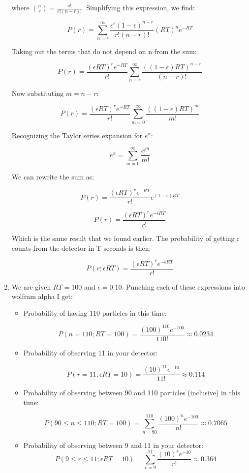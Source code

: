 \documentclass[10pt]{article}
\begin{document}
\begin{enumerate}[label=(\alph*)]
	      where $\binom{n}{r} = \frac{n!}{r!(n-r)!}$. Simplifying this expression, we find:

	      \[ P(r) = \sum_{n=r}^{\infty} \frac{\epsilon^r (1 - \epsilon)^{n - r}}{r!(n-r)!} (RT)^n e^{-RT} \]

	      Taking out the terms that do not depend on n from the sum:

	      \[ P(r) = \frac{(\epsilon RT)^r e^{-RT}}{r!} \sum_{n=r}^{\infty} \frac{((1 - \epsilon) RT)^{n - r}}{(n - r)!} \]

	      Now substituting $m=n-r$:

	      \[ P(r) = \frac{(\epsilon RT)^r e^{-RT}}{r!} \sum_{m=0}^{\infty} \frac{((1 - \epsilon) RT)^{m}}{m!} \]

	      Recognizing the Taylor series expansion for $e^x$:

	      \[ e^x = \sum_{m=0}^{\infty} \frac{x^m}{m!} \]

	      We can rewrite the sum as:

	      \[ P(r) = \frac{(\epsilon RT)^r e^{-RT}}{r!} e^{(1 - \epsilon) RT} \]

	      \[ P(r) = \frac{(\epsilon RT)^r e^{-\epsilon RT}}{r!} \]

	      Which is the same result that we found earlier. The probability of getting r counts from the detector in T seconds is then:

	      \[ \boxed{P(r; \epsilon RT) = \frac{(\epsilon RT)^r e^{-\epsilon RT}}{r!}} \]

	\item We are given $RT = 100$ and $\epsilon = 0.10$. Punching each of these expressions into wolfram alpha I get:

	      \begin{itemize}
		      \item Probability of having 110 particles in this time:

		            \[ \boxed{P(n=110; RT=100) = \frac{(100)^{110} e^{-100}}{110!} \approx 0.0234} \]

		      \item Probability of observing 11 in your detector:

		            \[ \boxed{P(r=11; \epsilon RT=10) = \frac{(10)^{11} e^{-10}}{11!} \approx 0.114} \]

		      \item Probability of observing between 90 and 110 particles (inclusive) in this time:

		            \[ \boxed{P(90 \leq n \leq 110; RT=100) = \sum_{n=90}^{110} \frac{(100)^n e^{-100}}{n!} \approx 0.7065} \]

		      \item Probability of observing between 9 and 11 in your detector:
		            \[ \boxed{P(9 \leq r \leq 11; \epsilon RT=10) = \sum_{r=9}^{11} \frac{(10)^r e^{-10}}{r!} \approx 0.364} \]
	      \end{itemize}
\end{enumerate}
\end{document}
